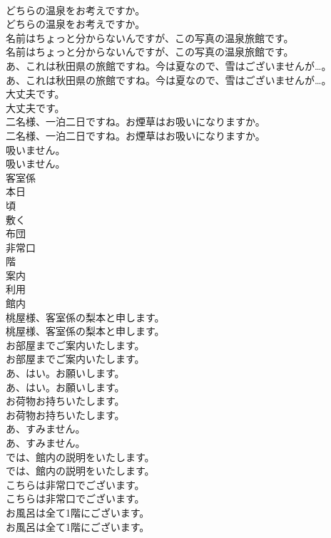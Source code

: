 \documentclass[8pt]{extreport}
\begin{document}
\begin{CJK}{UTF8}{min}
\\	どちらの温泉をお考えですか。	
\\	どちらの温泉をお考えですか。 
\\	名前はちょっと分からないんですが、この写真の温泉旅館です。	
\\	名前はちょっと分からないんですが、この写真の温泉旅館です。 
\\	あ、これは秋田県の旅館ですね。今は夏なので、雪はございませんが…。	
\\	あ、これは秋田県の旅館ですね。今は夏なので、雪はございませんが…。 
\\	大丈夫です。	
\\	大丈夫です。 
\\	二名様、一泊二日ですね。お煙草はお吸いになりますか。	
\\	二名様、一泊二日ですね。お煙草はお吸いになりますか。 
\\	吸いません。	
\\	吸いません。 
\\	客室係
\\	本日
\\	頃
\\	敷く
\\	布団
\\	非常口
\\	階
\\	案内
\\	利用
\\	館内
\\	桃屋様、客室係の梨本と申します。	
\\	桃屋様、客室係の梨本と申します。 
\\	お部屋までご案内いたします。	
\\	お部屋までご案内いたします。 
\\	あ、はい。お願いします。	
\\	あ、はい。お願いします。 
\\	お荷物お持ちいたします。	
\\	お荷物お持ちいたします。 
\\	あ、すみません。	
\\	あ、すみません。 
\\	では、館内の説明をいたします。	
\\	では、館内の説明をいたします。 
\\	こちらは非常口でございます。	
\\	こちらは非常口でございます。 
\\	お風呂は全て1階にございます。	
\\	お風呂は全て1階にございます。 

\end{CJK}
\end{document}

